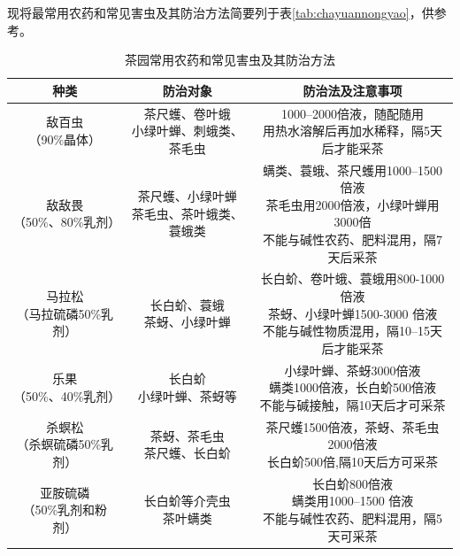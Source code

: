 \documentclass{ctexbook}
\begin{document}
现将最常用农药和常见害虫及其防治方法简要列于表\ref{tab:chayuannongyao}，供参考。

\begin{table}[htbp]
	\centering
	\caption{茶园常用农药和常见害虫及其防治方法}
	\begin{tabular}{c|c|c}
		\hline
		种类    & 防治对象  & 防治法及注意事项 \\
		\hline
		\thead{敌百虫\\（90\%晶体）} & \thead{茶尺蠖、卷叶蛾\\小绿叶蝉、刺蛾类、茶毛虫} & \thead{1000--2000倍液，随配随用\\用热水溶解后再加水稀释，隔5天后才能采茶} \\
		\hline
		\thead{敌敌畏\\（50\%、80\%乳剂）} & \thead{茶尺蠖、小绿叶蝉\\茶毛虫、茶叶蛾类、蓑蛾类} & \thead{螨类、蓑蛾、茶尺蠖用1000--1500倍液\\茶毛虫用2000倍液，小绿叶蝉用3000倍\\不能与碱性农药、肥料混用，隔7天后采茶} \\
		\hline
		\thead{马拉松\\（马拉硫磷50\%乳剂）} & \thead{长白蚧、蓑蛾\\茶蚜、小绿叶蝉} & \thead{长白蚧、卷叶蛾、蓑蛾用800-1000 倍液\\茶蚜、小绿叶蝉1500-3000 倍液\\不能与碱性物质混用，隔10--15天后才能采茶} \\
		\hline
		\thead{乐果\\（50\%、40\%乳剂）} & \thead{长白蚧\\小绿叶蝉、茶蚜等} & \thead{小绿叶蝉、茶蚜3000倍液\\螨类1000倍液，长白蚧500倍液\\不能与碱接触，隔10天后才可采茶} \\
		\hline
		\thead{杀螟松\\（杀螟硫磷50\%乳剂）} & \thead{茶蚜、茶毛虫\\茶尺蠖、长白蚧} & \thead{茶尺蠖1500倍液，茶蚜、茶毛虫2000倍液\\长白蚧500倍,隔10天后方可采茶} \\
		\hline
		\thead{亚胺硫磷\\（50\%乳剂和粉剂）} & \thead{长白蚧等介壳虫\\茶叶螨类} &\thead{长白蚧800倍液\\螨类用1000--1500 倍液\\不能与碱性农药、肥料混用，隔5天可采茶}\\

\end{tabular}
\end{table}
\end{document}
